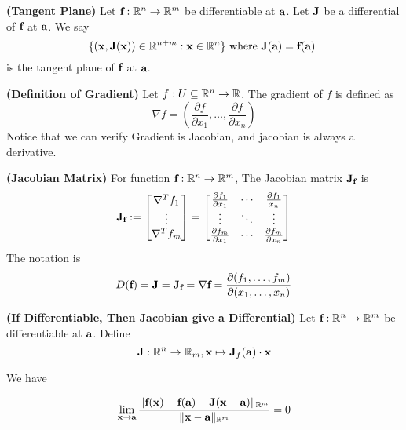 \documentclass{report}
\begin{document}
\begin{definition}
\label{4.2.4}
\textbf{(Tangent Plane)} Let $\textbf{f}:\mathbb{R}^n\rightarrow \mathbb{R}^m$ be differentiable at $\textbf{a}$. Let $\textbf{J}$ be a differential of $\textbf{f}$ at $\textbf{a}$. We say
\begin{equation}
\{ (\textbf{x},\textbf{J}(\textbf{x}))\in\mathbb{R}^{n+m}:\textbf{x}\in\mathbb{R}^n \}\text{ where $\textbf{J}(\textbf{a})=\textbf{f}(\textbf{a})$ }
\end{equation}
is the tangent plane of $\textbf{f}$ at $\textbf{a}$.
\end{definition}
\begin{definition}
\label{4.2.5}
\textbf{(Definition of Gradient)}  Let $f:U\subseteq \mathbb{R}^n \rightarrow \mathbb{R}$. The gradient of $f$ is defined as
\begin{equation}
  \nabla f=(\frac{\partial f}{\partial x_1},\dots ,\frac{\partial f}{\partial x_n})
\end{equation}
Notice that we can verify Gradient is Jacobian, and jacobian is always a derivative. 
\end{definition}

\begin{definition}
\label{4.2.6}
\textbf{(Jacobian Matrix)} For function $\textbf{f}:\mathbb{R}^n\rightarrow \mathbb{R}^m$, The Jacobian matrix  $\textbf{J}_{\textbf{f}}$ is  
\begin{equation}
  \textbf{J}_{\textbf{f}}:=\begin{bmatrix}
\nabla ^T f_{1}\\
\vdots\\
\nabla^T f_m
    \end{bmatrix}=\begin{bmatrix}
    \frac{\partial f_1}{\partial x_1}&\cdots & \frac{\partial f_1}{x_n}\\
    \vdots & \ddots & \vdots\\
    \frac{\partial f_m}{\partial x_1} & \cdots & \frac{\partial f_m}{\partial x_n}
    \end{bmatrix}
\end{equation}
The notation is
\begin{equation}
  D(\textbf{f})=\textbf{J}=\textbf{J}_{\textbf{f}}=\nabla \textbf{f}=\frac{\partial (f_1,\dots, f_m)}{\partial  (x_1,\dots,x_n)}
\end{equation}
\end{definition}

\begin{theorem}
\label{4.2.7}
\textbf{(If Differentiable, Then Jacobian give a Differential)}
Let $\textbf{f}:\mathbb{R}^n\rightarrow \mathbb{R}^m$ be differentiable at $\textbf{a}$. Define
\begin{equation}
 \textbf{J}:\mathbb{R}^n\rightarrow \mathbb{R}_m, \textbf{x}\mapsto \textbf{J}_f(\textbf{a})\cdot \textbf{x}
\end{equation}

We have

\begin{equation}
\lim_{\textbf{x}\to \textbf{a}}\frac{\| \textbf{f}(\textbf{x})-\textbf{f}(\textbf{a})-\textbf{J}(\textbf{x}-\textbf{a}) \|_{\mathbb{R}^m}}{\| \textbf{x}-\textbf{a} \|_{\mathbb{R}^m}}=0
\end{equation}
\end{theorem}
\end{document}
